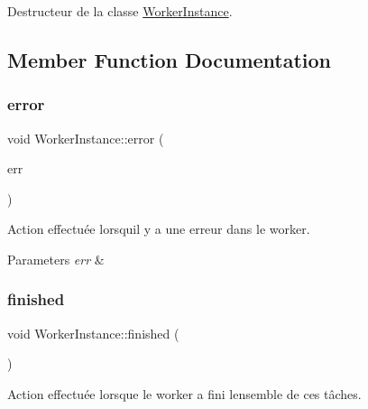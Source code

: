 Destructeur de la classe \hyperlink{classWorkerInstance}{Worker\+Instance}. 



\subsection{Member Function Documentation}
\mbox{\label{classWorkerInstance_a7327b868e3d96daa63e71c47076e598e}} 
\subsubsection{\texorpdfstring{error}{error}}
{\footnotesize\ttfamily void Worker\+Instance\+::error (\begin{DoxyParamCaption}\item[{Q\+String}]{err }\end{DoxyParamCaption})\hspace{0.3cm}{\ttfamily [signal]}}



Action effectuée lorsqu\textquotesingle{}il y a une erreur dans le worker. 


\begin{DoxyParams}{Parameters}
{\em err} & \\
\hline
\end{DoxyParams}
\mbox{\label{classWorkerInstance_ac9e45034de2450472fcc07ba0b960000}} 
\subsubsection{\texorpdfstring{finished}{finished}}
{\footnotesize\ttfamily void Worker\+Instance\+::finished (\begin{DoxyParamCaption}{ }\end{DoxyParamCaption})\hspace{0.3cm}{\ttfamily [signal]}}



Action effectuée lorsque le worker a fini l\textquotesingle{}ensemble de ces tâches. 

